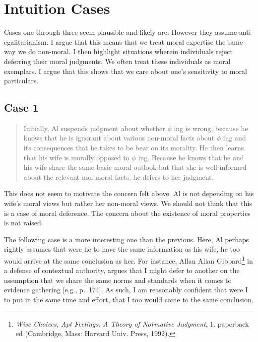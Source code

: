 \documentclass[
  12pt,
]{book}
\theoremstyle{definition}
\theoremstyle{definition}
\theoremstyle{definition}
\theoremstyle{definition}
\theoremstyle{remark}
\begin{document}
\section{Intuition Cases}\label{intuition-cases}

Cases one through three seem plausible and likely are. However they assume anti egalitarianism. I argue that this means that we treat moral expertise the same way we do non-moral. I then highlight situations wherein individuals reject deferring their moral judgments. We often treat these individuals as moral exemplars. I argue that this shows that we care about one's sensitivity to moral particulars.

\subsection*{Case 1}\label{case-1}

\begin{quote}
Initially, Al suspends judgment about whether \(\phi\) ing is wrong, because he knows that he is ignorant about various non-moral facts about \(\phi\) ing and its consequences that he takes to be bear on its morality. He then learns that his wife is morally opposed to \(\phi\) ing. Because he knows that he and his wife share the same basic moral outlook but that she is well informed about the relevant non-moral facts, he defers to her judgment.
\end{quote}

This does not seem to motivate the concern felt above. Al is not depending on his wife's moral views but rather her non-moral views. We should not think that this is a case of moral deference. The concern about the existence of moral properties is not raised.

The following case is a more interesting one than the previous. Here, Al perhaps rightly assumes that were he to have the same information as his wife, he too would arrive at the same conclusion as her. For instance, Allan Allan Gibbard\footnote{\emph{Wise Choices, Apt Feelings: A Theory of Normative Judgment}, 1. paperback ed (Cambridge, Mass: Harvard Univ. Press, 1992).} in a defense of contextual authority, argues that I might defer to another on the assumption that we share the same norms and standards when it comes to evidence gathering {[}e.g., p.~174{]}. As such, I am reasonably confident that were I to put in the same time and effort, that I too would come to the same conclusion.
\end{document}
